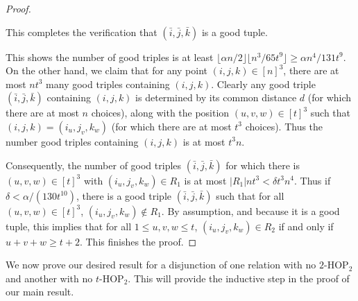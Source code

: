 \documentclass[12pt,oneside,british,a4wide]{amsart}
\numberwithin{equation}{section}
\theoremstyle{definition}
\def\HOP{\mathrm{HOP}}
\newcommand{\ibar}{\bar{i}}
\newcommand{\jbar}{\bar{j}}
\newcommand{\kbar}{\bar{k}}
\begin{document}
\begin{proof}
\begin{itemize}
This completes the verification that $(\ibar,\jbar,\kbar)$ is a good tuple.
\end{itemize}
This shows the number of good triples is at least $\lfloor \alpha n/2\rfloor \lfloor n^3/65t^9\rfloor \geq \alpha n^4 /131 t^9$.    On the other hand, we claim that for any point $(i,j,k)\in [n]^3$, there are at most $nt^3$ many good triples containing $(i,j,k)$.  Clearly any good triple $(\ibar,\jbar,\kbar)$ containing $(i,j,k)$ is determined by its common distance $d$ (for which there are at most $n$ choices), along with the position $(u,v,w)\in [t]^3$ such that $(i,j,k)=(i_u,j_v,k_w)$ (for which there are at most $t^3$ choices).  Thus the number good triples containing $(i,j,k)$ is at most $t^3 n$.


Consequently, the number of good triples $(\ibar,\jbar,\kbar)$ for which there is $(u,v,w)\in [t]^3$ with $(i_u,j_v,k_w)\in R_1$ is at most $|R_1|nt^3<\delta t^3n^4$.  Thus if $\delta<\alpha/(130t^{10})$, there is a good triple $(\ibar,\jbar,\kbar)$ such that for all $(u,v,w)\in [t]^3$, $(i_u,j_v,k_w)\notin R_1$.  By assumption, and because it is a good tuple, this implies that for all $1\leq u,v,w\leq t$, $(i_u,j_v,k_w)\in R_2$ if and only if $u+v+w\geq t+2$. This finishes the proof.
\end{proof}


We now prove our desired result for a disjunction of one relation with no $2$-$\HOP_2$ and another with no $t$-$\HOP_2$.  This will provide the inductive step in the proof of our main result.
\end{document}
